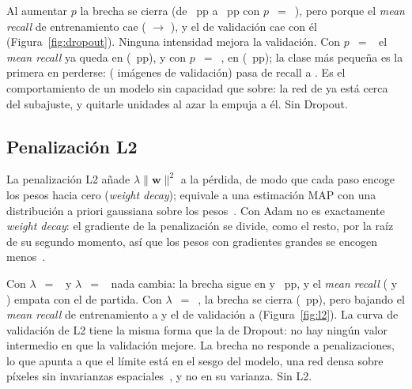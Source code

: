 {Al aumentar $p$ la brecha se cierra (de ~pp a ~pp con
$p$~$=$~), pero porque el \emph{mean recall} de entrenamiento cae
( $\rightarrow$ ), y el de validación cae con él
(Figura~\ref{fig:dropout}).}
{Ninguna intensidad mejora la validación. Con $p$~$=$~ el \emph{mean recall} ya queda en
 (~pp), y con $p$~$=$~, en
 (~pp); la clase más pequeña es la primera en perderse:  ( imágenes de validación) pasa de recall
 a . Es el comportamiento de un modelo sin capacidad que
sobre: la red de  ya está cerca del subajuste, y quitarle unidades al azar la empuja a él.}
{Sin Dropout.}

\subsection{Penalización L2}
La penalización L2 añade $\lambda \lVert \mathbf{w} \rVert^2$ a la pérdida, de modo que cada paso encoge los pesos
hacia cero (\emph{weight decay}); equivale a una estimación MAP con una distribución a priori gaussiana sobre los
pesos~\cite{goodfellow}. Con Adam no es exactamente \emph{weight decay}: el gradiente de la penalización se divide,
como el resto, por la raíz de su segundo momento, así que los pesos con gradientes grandes se encogen
menos~\cite{loshchilov}.

{Con $\lambda$~$=$~ y $\lambda$~$=$~ nada cambia: la brecha sigue en
 y ~pp, y el \emph{mean recall} ( y
) empata con el de partida. Con $\lambda$~$=$~, la brecha se cierra
(~pp), pero bajando el \emph{mean recall} de entrenamiento a  y el
de validación a  (Figura~\ref{fig:l2}).}
{La curva de validación de L2 tiene la misma forma que la de Dropout: no hay ningún valor intermedio en que la
validación mejore. La brecha no responde a penalizaciones, lo que apunta a que el límite está en el sesgo del modelo,
una red densa sobre píxeles sin invarianzas espaciales~\cite{goodfellow}, y no en su varianza.}
{Sin L2.}

